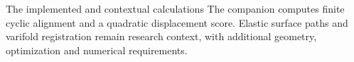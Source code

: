 \documentclass[aspectratio=169,11pt]{beamer}
\newcommand{\notestarget}{notes.pdf}\newcommand{\noteslabel}{Notes}
\begin{document}
\renewcommand{\notestarget}{notes.pdf\#note-invariant-comparisons-and-scientific-interpretation}
\begin{frame}[t,fragile,label=slide-the-implemented-and-contextual-calculations]{The implemented and contextual calculations}
The companion computes finite cyclic alignment and a quadratic displacement score.\pause{} Elastic surface paths and varifold registration remain research context, with additional geometry, optimization and numerical requirements.
\end{frame}
\end{document}
